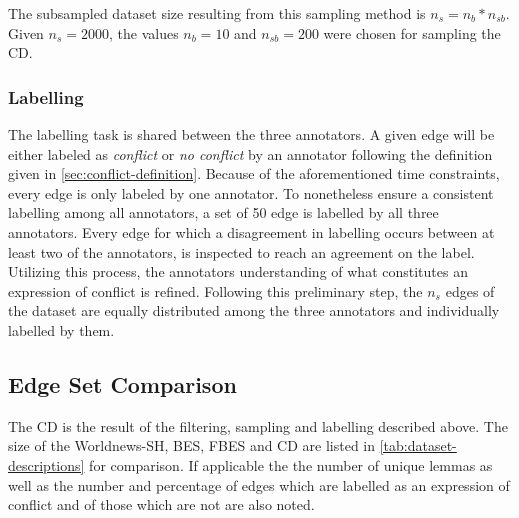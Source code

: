 \documentclass[11pt]{scrreprt}
\begin{document}
The subsampled dataset size resulting from this sampling method is \(n_{s} = n_{b} * n_{sb}\). Given \(n_{s} = 2000\), the values \(n_b = 10\) and \(n_{sb} = 200\) were chosen for sampling the CD.


\subsubsection{Labelling}
The labelling task is shared between the three annotators. A given edge will be either labeled as \textit{conflict} or \textit{no conflict} by an annotator following the definition given in \cref{sec:conflict-definition}. Because of the aforementioned time constraints, every edge is only labeled by one annotator. To nonetheless ensure a consistent labelling among all annotators, a set of 50 edge is labelled by all three annotators. Every edge for which a disagreement in labelling occurs between at least two of the annotators, is inspected to reach an agreement on the label. Utilizing this process, the annotators understanding of what constitutes an expression of conflict is refined. Following this preliminary step, the \(n_s\) edges of the dataset are equally distributed among the three annotators and individually labelled by them.


\subsection{Edge Set Comparison}
The CD is the result of the filtering, sampling and labelling described above. The size of the Worldnews-SH, BES, FBES and CD are listed in \cref{tab:dataset-descriptions} for comparison. If applicable the the number of unique lemmas as well as the number and percentage of edges which are labelled as an expression of conflict and of those which are not are also noted.
\end{document}
